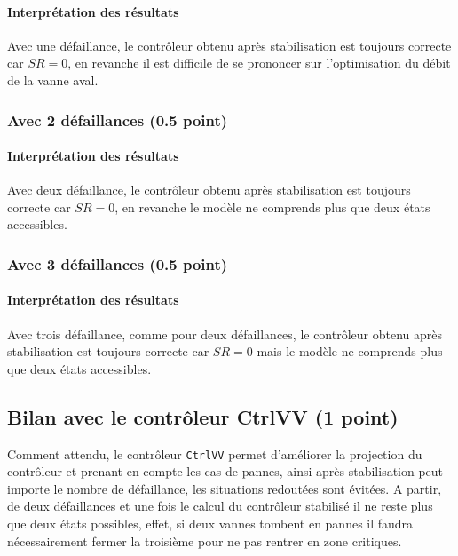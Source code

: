 \documentclass[a4paper]{book}
\begin{document}
\paragraph{Interprétation des résultats}

Avec une défaillance, le contrôleur obtenu après stabilisation est toujours
correcte car $SR = 0$, en revanche il est difficile de se prononcer sur
l'optimisation du débit de la vanne aval.

\subsubsection{Avec 2 défaillances (0.5 point)}

\paragraph{Interprétation des résultats}

Avec deux défaillance, le contrôleur obtenu après stabilisation est toujours
correcte car $SR = 0$, en revanche le modèle ne comprends plus que deux états
accessibles.

\subsubsection{Avec 3 défaillances (0.5 point)}

\paragraph{Interprétation des résultats}

Avec trois défaillance, comme pour deux défaillances, le contrôleur obtenu
après stabilisation est toujours correcte car $SR = 0$ mais le modèle ne
comprends plus que deux états accessibles.

\subsection{Bilan avec le contrôleur CtrlVV (1 point)}

Comment attendu, le contrôleur \texttt{CtrlVV} permet d'améliorer la projection
du contrôleur et prenant en compte les cas de pannes, ainsi après stabilisation
peut importe le nombre de défaillance, les situations redoutées sont évitées. A
partir, de deux défaillances et une fois le calcul du contrôleur stabilisé il
ne reste plus que deux états possibles, effet, si deux vannes tombent en pannes
il faudra nécessairement fermer la troisième pour ne pas rentrer en zone
critiques.
\end{document}
